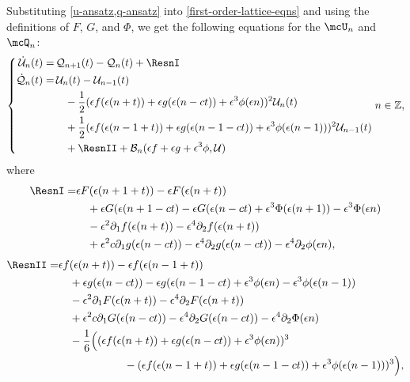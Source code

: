 \documentclass[oneside,reqno]{amsart}
\newcommand{\Z}{\mathbb{Z}}
\begin{document}
Substituting \cref{u-ansatz,q-ansatz} into \cref{first-order-lattice-eqns} and using the definitions of \(F\), \(G\), and \(\Phi\), we get the following equations for the \(\mcU_n\) and \(\mcQ_n\): 
\begin{equation}\label{error-lattice-eqns}
	\left\{\begin{aligned}
		\dot{\mathcal U}_n(t) =& \, \mathcal Q_{n+1}(t) - \mathcal Q_n(t) +\ResnI \\
		\dot{\mathcal Q}_n(t) =& \, \mathcal U_n(t) - \mathcal U_{n-1}(t)  \\
		&\quad - \frac 1 2 (\epsilon f(\epsilon(n+t)) + \epsilon g(\epsilon(n-ct)) + \epsilon^3\phi(\epsilon n))^2 \mathcal U_{n}(t) \\
		&\quad + \frac 12  (\epsilon f(\epsilon(n-1+t)) + \epsilon g(\epsilon(n-1-ct)) + \epsilon^3\phi(\epsilon (n-1)))^2 \mathcal U_{n-1}(t) \\
		&\quad +\ResnII + \mathcal B_n(\epsilon f + \epsilon g + \epsilon^3 \phi,  \mathcal U) 
	\end{aligned} \right. n\in\Z,
\end{equation}
where
\begin{equation*}
	\begin{aligned}
		\ResnI =& \epsilon F(\epsilon(n+1+t)) - \epsilon F(\epsilon(n+t)) \\
		&\quad + \epsilon G(\epsilon(n+1-c t) - \epsilon G(\epsilon(n-c t) + \epsilon^3 \Phi(\epsilon (n+1))   - \epsilon^3 \Phi(\epsilon n) \\
		&\quad - \epsilon^2 \partial_1 f(\epsilon(n+t)) - \epsilon^4 \partial_2
		f(\epsilon(n+t)) \\
		&\quad + \epsilon^2 c \partial_1 g(\epsilon(n-ct)) - \epsilon^4 \partial_2 g(\epsilon(n-ct)) - \epsilon^4 \partial_2 \phi(\epsilon n) ,
	\end{aligned}
\end{equation*}
\begin{equation*}
	\begin{aligned}
		\ResnII =& \epsilon f(\epsilon(n+t)) - \epsilon f(\epsilon(n-1+t)) \\
		&\quad+ \epsilon g(\epsilon(n-c t)) - \epsilon g(\epsilon(n-1-c t) + \epsilon^3 \phi(\epsilon n) - \epsilon^3 \phi(\epsilon (n-1)) \\
		&\quad - \epsilon^2 \partial_1 F(\epsilon(n+t)) - \epsilon^4 \partial_2
		F(\epsilon(n+t)) \\
		&\quad + \epsilon^2 c \partial_1 G(\epsilon(n-ct)) - \epsilon^4 \partial_2 G(\epsilon(n-ct)) - \epsilon^4 \partial_2 \Phi(\epsilon n) \\
		&\quad - \frac 1 6 \Big( (\epsilon f(\epsilon(n+t)) + \epsilon g(\epsilon(n-c t)) + \epsilon^3 \phi(\epsilon n))^3 \\
		&\hspace{6em} - (\epsilon f(\epsilon(n-1+t)) + \epsilon g(\epsilon(n-1-c t)) + \epsilon^3 \phi(\epsilon (n-1)))^3 \Big),
	\end{aligned}
\end{equation*}
\end{document}
